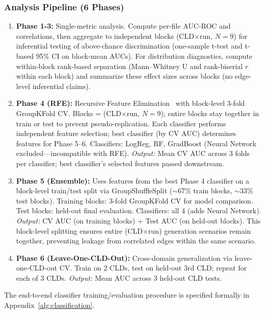 \subsubsection{Analysis Pipeline (6 Phases)}
\begin{enumerate}[noitemsep]
    \item \textbf{Phase 1-3:} Single-metric analysis. Compute per-file AUC-ROC and correlations, then aggregate to independent blocks (CLD$\times$run, $N=9$) for inferential testing of above-chance discrimination (one-sample t-test and t-based 95\% CI on block-mean AUCs). For distribution diagnostics, compute within-block rank-based separation (Mann--Whitney U and rank-biserial $r$ within each block) and summarize these effect sizes across blocks (no edge-level inferential claims).
    \item \textbf{Phase 4 (RFE):} Recursive Feature Elimination~\cite{pedregosa2011sklearn} with block-level 3-fold GroupKFold CV. Blocks = (CLD$\times$run, $N=9$); entire blocks stay together in train or test to prevent pseudo-replication. Each classifier performs independent feature selection; best classifier (by CV AUC) determines features for Phase 5--6. Classifiers: LogReg, RF, GradBoost (Neural Network excluded---incompatible with RFE). \textit{Output:} Mean CV AUC across 3 folds per classifier; best classifier's selected features passed downstream.
    \item \textbf{Phase 5 (Ensemble):} Uses features from the best Phase 4 classifier on a block-level train/test split via GroupShuffleSplit ($\sim$67\% train blocks, $\sim$33\% test blocks). Training blocks: 3-fold GroupKFold CV for model comparison. Test blocks: held-out final evaluation. Classifiers: all 4 (adds Neural Network). \textit{Output:} CV AUC (on training blocks) + Test AUC (on held-out blocks). This block-level splitting ensures entire (CLD$\times$run) generation scenarios remain together, preventing leakage from correlated edges within the same scenario.
    \item \textbf{Phase 6 (Leave-One-CLD-Out):} Cross-domain generalization via leave-one-CLD-out CV. Train on 2 CLDs, test on held-out 3rd CLD; repeat for each of 3 CLDs. \textit{Output:} Mean AUC across 3 held-out CLD tests.
\end{enumerate}
The end-to-end classifier training/evaluation procedure is specified formally in Appendix~\ref{alg:classification}.


